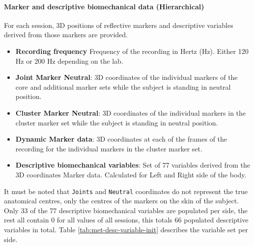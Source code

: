 {\paragraph{Marker and descriptive biomechanical data (Hierarchical)} For each session, 3D positions of reflective markers and descriptive variables derived from those markers are provided.
\begin{itemize}
    \item \textbf{Recording frequency} Frequency of the recording in Hertz (Hz). Either 120 Hz or 200 Hz depending on the lab.
    \item \textbf{Joint Marker Neutral}: 3D coordinates of the individual markers of the core and additional marker sets while the subject is standing in neutral position.
    \item \textbf{Cluster Marker Neutral}: 3D coordinates of the individual markers in the cluster marker set while the subject is standing in neutral position.
    \item \textbf{Dynamic Marker data}: 3D coordinates at each of the frames of the recording for the individual markers in the cluster marker set.
    \item \textbf{Descriptive biomechanical variables}: Set of 77 variables derived from the 3D coordinates Marker data. Calculated for Left and Right side of the body.
\end{itemize}

It must be noted that \texttt{Joints} and \texttt{Neutral} coordinates do not represent the true anatomical centres, only the centres of the markers on the skin of the subject.
Only 33 of the 77 descriptive biomechanical variables are populated per side, the rest all contain 0 for all values of all sessions, this totals 66 populated descriptive variables in total. Table \ref{tab:met-desc-variable-init} describes the variable set per side.

}
